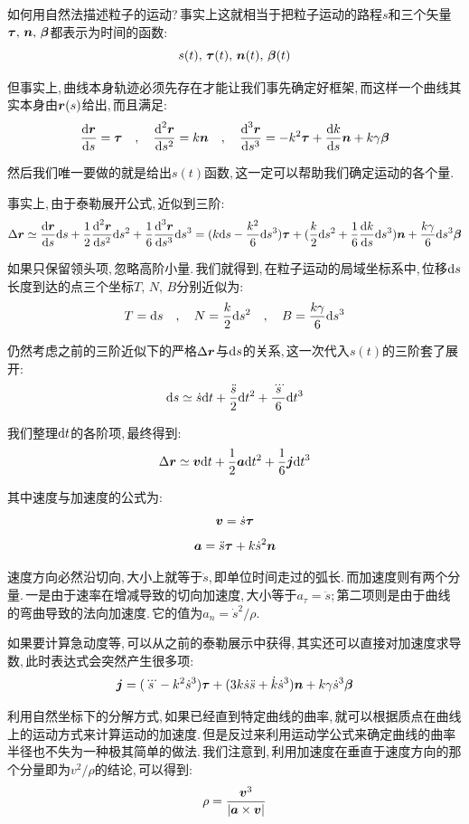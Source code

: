 如何用自然法描述粒子的运动?\,事实上这就相当于把粒子运动的路程$s$和三个矢量$\boldsymbol{\tau},\,\boldsymbol{n},\,\boldsymbol{\beta}$都表示为时间的函数:
\[s(t),\,\boldsymbol{\tau}(t),\,\boldsymbol{n}(t),\,\boldsymbol{\beta}(t)\]

但事实上,\,曲线本身轨迹必须先存在才能让我们事先确定好框架,\,而这样一个曲线其实本身由$\boldsymbol{r}(s)$给出,\,而且满足:
\[\frac{\textrm{d} \boldsymbol{r}}{\textrm{d} s}=\boldsymbol{\tau}\quad,\quad \frac{\textrm{d}^2 \boldsymbol{r}}{\textrm{d} s^2}=k\boldsymbol{n}\quad,\quad \frac{\textrm{d}^3 \boldsymbol{r}}{\textrm{d} s^3}=-k^2\boldsymbol{\tau}+\frac{\textrm{d} k}{\textrm{d} s}\boldsymbol{n}+k\gamma\boldsymbol{\beta}\]

然后我们唯一要做的就是给出$s(t)$函数,\,这一定可以帮助我们确定运动的各个量.

事实上,\,由于泰勒展开公式,\,近似到三阶:
\[\Delta \boldsymbol{r}\simeq\frac{\textrm{d} \boldsymbol{r}}{\textrm{d} s}\textrm{d} s+\frac{1}{2}\frac{\textrm{d}^2 \boldsymbol{r}}{\textrm{d} s^2}\textrm{d} s^2+\frac{1}{6}\frac{\textrm{d}^3 \boldsymbol{r}}{\textrm{d} s^3}\textrm{d} s^3=(k\textrm{d} s-\frac{k^2}{6}\textrm{d} s^3)\boldsymbol{\tau}+(\frac{k}{2}\textrm{d} s^2+\frac{1}{6}\frac{\textrm{d} k}{\textrm{d} s}\textrm{d} s^3)\boldsymbol{n}+\frac{k\gamma}{6}\textrm{d} s^3\boldsymbol{\beta}\]

如果只保留领头项,\,忽略高阶小量.\,我们就得到,\,在粒子运动的局域坐标系中,\,位移$\textrm{d} s$长度到达的点三个坐标$T,\,N,\,B$分别近似为:
\[T=\textrm{d} s \quad,\quad N=\frac{k}{2}\textrm{d} s^2 \quad,\quad B=\frac{k\gamma}{6}\textrm{d} s^3\]

仍然考虑之前的三阶近似下的严格$\Delta \boldsymbol{r}$与$\textrm{d}{s}$的关系,\,这一次代入$s(t)$的三阶套了展开:
\[\textrm{d} s\simeq \dot{s}\textrm{d} t+\frac{\ddot{s}}{2}\textrm{d} t^2+\frac{\dddot{s}}{6}\textrm{d} t^3\]

我们整理$\textrm{d} t$的各阶项,\,最终得到:
\[\Delta \boldsymbol{r}\simeq \boldsymbol{v}\textrm{d} t+\frac{1}{2}\boldsymbol{a}\textrm{d} t^2+\frac{1}{6}\boldsymbol{j}\textrm{d} t^3\]

其中速度与加速度的公式为:
\[\boldsymbol{v}=\dot{s}\boldsymbol{\tau}\]
\[\boldsymbol{a}=\ddot{s}\boldsymbol{\tau}+k\dot{s}^2\boldsymbol{n}\]

速度方向必然沿切向,\,大小上就等于$\dot{s}$,\,即单位时间走过的弧长.\,而加速度则有两个分量.\,一是由于速率在增减导致的切向加速度,\,大小等于$a_\tau=\ddot{s}$;\,第二项则是由于曲线的弯曲导致的法向加速度.\,它的值为$a_n=\dot{s}^2/\rho$.\,

如果要计算急动度等,\,可以从之前的泰勒展示中获得,\,其实还可以直接对加速度求导数,\,此时表达式会突然产生很多项:
\[\boldsymbol{j}=(\dddot{s}-k^2\dot{s}^3)\boldsymbol{\tau}+(3k\dot{s}\ddot{s}+\dot{k}\dot{s}^3)\boldsymbol{n}+k\gamma\dot{s}^3\boldsymbol{\beta}\]

利用自然坐标下的分解方式,\,如果已经直到特定曲线的曲率,\,就可以根据质点在曲线上的运动方式来计算运动的加速度.\,但是反过来利用运动学公式来确定曲线的曲率半径也不失为一种极其简单的做法.\,我们注意到,\,利用加速度在垂直于速度方向的那个分量即为$v^2/\rho$的结论,\,可以得到:
\[\rho=\frac{\boldsymbol{v}^3}{\left| \boldsymbol{a}\times\boldsymbol{v} \right|}\]

